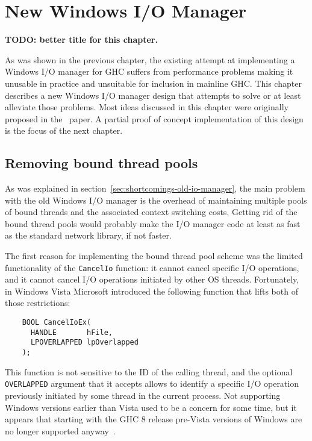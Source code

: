 \documentclass[a4paper,11pt,oneside]{report}
\begin{document}
\chapter{New Windows I/O Manager}
\label{chap:new-io-manager}

\textbf{TODO: better title for this chapter.}

As was shown in the previous chapter, the existing attempt at implementing a
Windows I/O manager for GHC suffers from performance problems making it unusable
in practice and unsuitable for inclusion in mainline GHC. This chapter describes
a new Windows I/O manager design that attempts to solve or at least alleviate
those problems. Most ideas discussed in this chapter were originally proposed in
the~\cite{bib:voellmy} paper. A partial proof of concept implementation of this
design is the focus of the next chapter.

\section{Removing bound thread pools}

As was explained in section~\ref{sec:shortcomings-old-io-manager}, the main
problem with the old Windows I/O manager is the overhead of maintaining multiple
pools of bound threads and the associated context switching costs. Getting rid
of the bound thread pools would probably make the I/O manager code at least as
fast as the standard network library, if not faster.

The first reason for implementing the bound thread pool scheme was the limited
functionality of the \texttt{CancelIo} function: it cannot cancel specific I/O
operations, and it cannot cancel I/O operations initiated by other OS
threads. Fortunately, in Windows Vista Microsoft introduced the following
function that lifts both of those restrictions:

\begin{verbatim}
    BOOL CancelIoEx(
      HANDLE       hFile,
      LPOVERLAPPED lpOverlapped
    );
\end{verbatim}

This function is not sensitive to the ID of the calling thread, and the optional
\texttt{OVERLAPPED} argument that it accepts allows to identify a specific I/O
operation previously initiated by some thread in the current process. Not
supporting Windows versions earlier than Vista used to be a concern for some
time, but it appears that starting with the GHC 8 release pre-Vista versions of
Windows are no longer supported anyway~\cite{bib:ghc-wiki-windows-ghc}.
\end{document}
